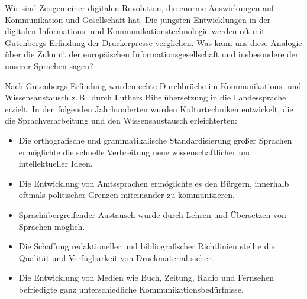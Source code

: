 \documentclass[]{../../metanetpaper}
\begin{document}
\clearpage


\begin{multicols}{2}

  Wir sind Zeugen einer digitalen Revolution, die enorme Auswirkungen auf Kommunikation und Gesellschaft hat. Die jüngsten Entwicklungen in der digitalen In\-for\-ma\-tions- und Kommunikationstechnologie werden oft mit Gutenbergs Erfindung der Druckerpresse verglichen. Was kann uns diese Analogie über die Zukunft der europäischen Informationsgesellschaft und insbesondere der unserer Sprachen sagen?



Nach Gutenbergs Erfindung wurden echte Durchbrüche im Kom\-mu\-ni\-ka\-tions- und Wis\-sens\-aus\-tausch z.\,B.~durch Luthers Bibelübersetzung in die Landessprache  erzielt. In den folgenden Jahrhunderten wurden Kulturtechniken entwickelt, die die Sprachverarbeitung und den Wissensaustausch erleichterten:

\begin{itemize}
\item Die orthografische und grammatikalische Standardisierung großer Sprachen ermöglichte die schnelle Verbreitung neue wissenschaftlicher und intellektueller Ideen.
\item Die Entwicklung von Amtssprachen ermöglichte es den Bürgern, innerhalb oftmals politischer Grenzen miteinander zu kommunizieren.
\item Sprachübergreifender Austausch wurde durch Lehren und Übersetzen von Sprachen möglich.
\item Die Schaffung redaktioneller und bibliografischer Richtlinien stellte die Qualität und Verfügbarkeit von Druckmaterial sicher.
\item Die Entwicklung von Medien wie Buch, Zeitung, Radio und Fernsehen befriedigte ganz unterschiedliche Kommunikationsbedürfnisse.
\end{itemize}


\end{multicols}
\end{document}
